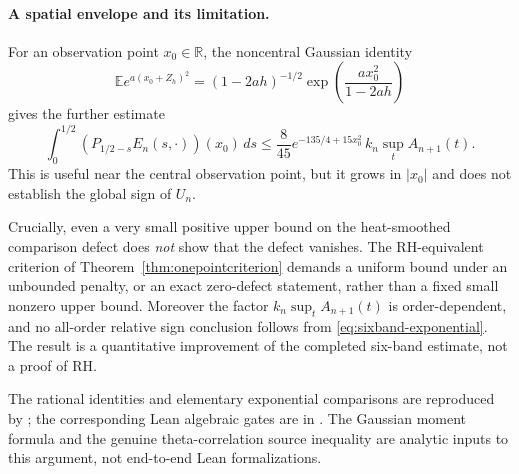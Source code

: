 \paragraph{A spatial envelope and its limitation.}
For an observation point $x_0\in\mathbb R$,
the noncentral Gaussian identity
\[
\mathbb E e^{a(x_0+Z_h)^2}
=(1-2ah)^{-1/2}
\exp\!\left(\frac{a x_0^2}{1-2ah}\right)
\]
gives the further estimate
\begin{equation}\label{eq:sixband-spatial-upper}
\int_0^{1/2}
(P_{1/2-s}E_n(s,\cdot))(x_0)\,ds
\le \frac8{45}
e^{-135/4+15x_0^2}\,
k_n\sup_t A_{n+1}(t).
\end{equation}
This is useful near the central observation point,
but it grows in $|x_0|$ and does not
establish the global sign of $U_n$.

Crucially, even a very small positive
upper bound on the heat-smoothed
comparison defect does \emph{not}
show that the defect vanishes. The
RH-equivalent criterion of
Theorem~\ref{thm:onepointcriterion}
demands a uniform bound under an
unbounded penalty, or an exact
zero-defect statement, rather than
a fixed small nonzero upper bound.
Moreover the factor
$k_n\sup_t A_{n+1}(t)$ is
order-dependent, and no
all-order relative sign conclusion
follows from \eqref{eq:sixband-exponential}.
The result is a quantitative
improvement of the completed
six-band estimate, not a proof of RH.

The rational identities and
elementary exponential comparisons
are reproduced by
;
the corresponding Lean algebraic
gates are in
.
The Gaussian moment formula
and the genuine theta-correlation
source inequality are analytic
inputs to this argument, not
end-to-end Lean formalizations.
